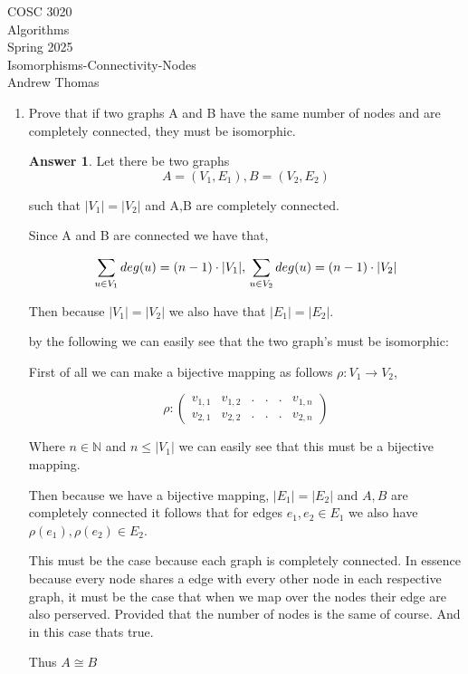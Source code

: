 \documentclass{amsart}
\theoremstyle{definition}
\newtheorem*{Ans}{Answer}
\begin{document}
\begin{center}
	{\bgbf COSC 3020\\ \smallskip
	Algorithms\\ \smallskip
	Spring 2025\\ \smallskip
	Isomorphisms-Connectivity-Nodes\\ \smallskip
        Andrew Thomas}
\end{center}
\smallskip

\begin{enumerate}	\item Prove that if two graphs 
A
 and 
B
 have the same number of nodes and are completely connected, they must be isomorphic.
		\begin{Ans}
        	Let there be two graphs $$A=(V_1,E_1),B=(V_2,E_2)$$ 

such that $|V_1|=|V_2|$ and A,B are completely connected.


Since A and B are connected we have that,

$$\sum_{u\in V_1}deg(u)=(n-1)\cdot |V_1|,\\
\sum_{u \in V_2}deg(u)=(n-1)\cdot |V_2|$$

Then because $|V_1|=|V_2|$ we also have that $|E_1|=|E_2|$.

by the following we can easily see that the two graph's must be isomorphic:

First of all we can make a bijective mapping as follows $\rho:V_1\longrightarrow V_2$,

$$\rho: \begin{pmatrix}v_{1,1}&v_{1,2}&.&.&.&v_{1,n}\\
v_{2,1}&v_{2,2}&.&.&.&v_{2,n} \end{pmatrix}$$ 

Where $n\in \mathbb{N}$ and $n\leq|V_1|$ we can easily see that this must be a bijective mapping.

Then because we have a bijective mapping, $|E_1|=|E_2|$ and $A,B$ are completely connected it follows that for edges $e_1,e_2\in E_1$ we also have $\rho(e_1),\rho(e_2)\in E_2$.

This must be the case because each graph is completely connected. In essence because every node shares a edge with every other node in each respective graph, it must be the case that when we map over the nodes their edge are also perserved. Provided that the number of nodes is the same of course. And in this case thats true.

Thus $A\cong B$
        \end{Ans}
\end{enumerate}
\end{document}
